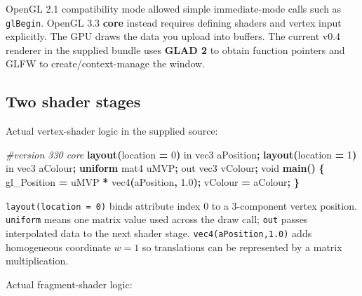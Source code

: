 \documentclass[
  10pt,
  a4paper,
]{article}
\newenvironment{Shaded}{\begin{snugshade}}{\end{snugshade}}
\newcommand{\BuiltInTok}[1]{#1}
\newcommand{\DataTypeTok}[1]{\textcolor[rgb]{0.13,0.29,0.53}{#1}}
\newcommand{\DecValTok}[1]{\textcolor[rgb]{0.00,0.00,0.81}{#1}}
\newcommand{\FloatTok}[1]{\textcolor[rgb]{0.00,0.00,0.81}{#1}}
\newcommand{\FunctionTok}[1]{\textcolor[rgb]{0.13,0.29,0.53}{\textbf{#1}}}
\newcommand{\KeywordTok}[1]{\textcolor[rgb]{0.13,0.29,0.53}{\textbf{#1}}}
\newcommand{\NormalTok}[1]{#1}
\newcommand{\OperatorTok}[1]{\textcolor[rgb]{0.81,0.36,0.00}{\textbf{#1}}}
\newcommand{\PreprocessorTok}[1]{\textcolor[rgb]{0.56,0.35,0.01}{\textit{#1}}}
\begin{document}
OpenGL 2.1 compatibility mode allowed simple immediate-mode calls such
as \texttt{glBegin}. OpenGL 3.3 \textbf{core} instead requires defining
shaders and vertex input explicitly. The GPU draws the data you upload
into buffers. The current v0.4 renderer in the supplied bundle uses
\textbf{GLAD 2} to obtain function pointers and GLFW to
create/context-manage the window.

\subsection{Two shader stages}\label{two-shader-stages}

Actual vertex-shader logic in the supplied source:

\begin{Shaded}
\begin{Highlighting}[]
\PreprocessorTok{\#version 330 core}
\KeywordTok{layout}\OperatorTok{(}\DataTypeTok{location} \OperatorTok{=} \DecValTok{0}\OperatorTok{)} \DataTypeTok{in} \DataTypeTok{vec3}\NormalTok{ aPosition}\OperatorTok{;}
\KeywordTok{layout}\OperatorTok{(}\DataTypeTok{location} \OperatorTok{=} \DecValTok{1}\OperatorTok{)} \DataTypeTok{in} \DataTypeTok{vec3}\NormalTok{ aColour}\OperatorTok{;}
\KeywordTok{uniform} \DataTypeTok{mat4}\NormalTok{ uMVP}\OperatorTok{;}
\DataTypeTok{out} \DataTypeTok{vec3}\NormalTok{ vColour}\OperatorTok{;}
\DataTypeTok{void} \FunctionTok{main}\OperatorTok{()} \OperatorTok{\{}
    \BuiltInTok{gl\_Position} \OperatorTok{=}\NormalTok{ uMVP }\OperatorTok{*} \DataTypeTok{vec4}\OperatorTok{(}\NormalTok{aPosition}\OperatorTok{,} \FloatTok{1.0}\OperatorTok{);}
\NormalTok{    vColour }\OperatorTok{=}\NormalTok{ aColour}\OperatorTok{;}
\OperatorTok{\}}
\end{Highlighting}
\end{Shaded}

\texttt{layout(location\ =\ 0)} binds attribute index 0 to a 3-component
vertex position. \texttt{uniform} means one matrix value used across the
draw call; \texttt{out} passes interpolated data to the next shader
stage. \texttt{vec4(aPosition,1.0)} adds homogeneous coordinate \(w=1\)
so translations can be represented by a matrix multiplication.

Actual fragment-shader logic:
\end{document}
